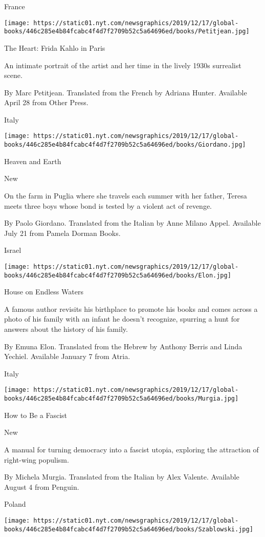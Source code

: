 France

\texttt{[image: https://static01.nyt.com/newsgraphics/2019/12/17/global-books/446c285e4b84fcabc4f4d7f2709b52c5a64696ed/books/Petitjean.jpg]}

The Heart: Frida Kahlo in Paris

An intimate portrait of the artist and her time in the lively 1930s
surrealist scene.

 By Marc Petitjean. Translated from the French by Adriana Hunter.
Available April 28 from Other Press.

Italy

\texttt{[image: https://static01.nyt.com/newsgraphics/2019/12/17/global-books/446c285e4b84fcabc4f4d7f2709b52c5a64696ed/books/Giordano.jpg]}

Heaven and Earth

New

On the farm in Puglia where she travels each summer with her father,
Teresa meets three boys whose bond is tested by a violent act of
revenge.

 By Paolo Giordano. Translated from the Italian by Anne Milano Appel.
Available July 21 from Pamela Dorman Books.

Israel

\texttt{[image: https://static01.nyt.com/newsgraphics/2019/12/17/global-books/446c285e4b84fcabc4f4d7f2709b52c5a64696ed/books/Elon.jpg]}

House on Endless Waters

A famous author revisits his birthplace to promote his books and comes
across a photo of his family with an infant he doesn't recognize,
spurring a hunt for answers about the history of his family.

 By Emuna Elon. Translated from the Hebrew by Anthony Berris and Linda
Yechiel. Available January 7 from Atria.

Italy

\texttt{[image: https://static01.nyt.com/newsgraphics/2019/12/17/global-books/446c285e4b84fcabc4f4d7f2709b52c5a64696ed/books/Murgia.jpg]}

How to Be a Fascist

New

A manual for turning democracy into a fascist utopia, exploring the
attraction of right-wing populism.

 By Michela Murgia. Translated from the Italian by Alex Valente.
Available August 4 from Penguin.

Poland

\texttt{[image: https://static01.nyt.com/newsgraphics/2019/12/17/global-books/446c285e4b84fcabc4f4d7f2709b52c5a64696ed/books/Szablowski.jpg]}

